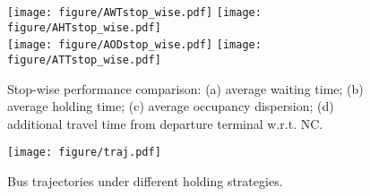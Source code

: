 \documentclass{article}
\begin{document}
\begin{figure}[!t]
\centering
 {\texttt{[image: figure/AWTstop\_wise.pdf]}\label{fig:wait_w}}\qquad
 {\texttt{[image: figure/AHTstop\_wise.pdf]}\label{fig:hold_w}}\\
 {\texttt{[image: figure/AODstop\_wise.pdf]}\label{fig:adt_w}}\qquad
 {\texttt{[image: figure/ATTstop\_wise.pdf]}\label{fig:h_w}}
\caption{Stop-wise performance comparison: (a) average waiting time; (b) average holding time; (c) average occupancy dispersion; (d) additional travel time from departure terminal w.r.t. NC.}
\label{fig:sw}
\end{figure}


\begin{figure}[!htbp]
\centering
     \texttt{[image: figure/traj.pdf]}
  \caption{Bus trajectories under different holding strategies.}
   \label{fig:tr}
\end{figure}
\end{document}
